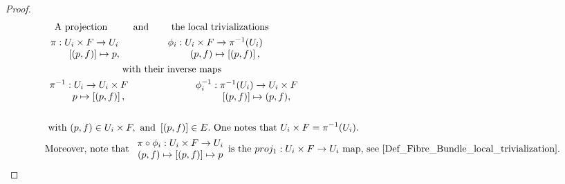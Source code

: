 \begin{proof}
    \begin{equation*}
        \begin{split}
            & \quad \textnormal{A projection } \qquad \textnormal{ and } \qquad  \textnormal{the local trivializations } \\
            &   \begin{array}{c}
                     \pi: U_i \times F \rightarrow U_i \\
                     \qquad \left[(p, f)\right] \mapsto p,
                \end{array} \qquad \qquad
                \begin{array}{cc}
                     \phi_i : U_i \times F \rightarrow \pi^{-1}(U_i)  \\
                     \qquad (p,f) \mapsto \left[(p,f)\right],
                \end{array} %
                \\
            &\qquad \qquad \qquad \qquad
            \textnormal{with their inverse maps } \\
            &   \begin{array}{c}
                     \pi^{-1}: U_i \rightarrow U_i \times F \\
                     \qquad p \mapsto \left[(p, f)\right],
                \end{array} \qquad \qquad \qquad 
                \begin{array}{cc}
                     \phi_i^{-1} : \pi^{-1}(U_i) \rightarrow U_i \times F \\
                     \qquad \left[(p,f)\right] \mapsto (p,f),
                \end{array} \\
            \\
            & \textnormal{ with } (p,f) \in U_i \times F, \textnormal{ and } \left[(p,f)\right] \in E. \textnormal{ One notes that } U_i \times F = \pi^{-1}(U_i). \\
            &\textnormal{Moreover, note that } \begin{array}{cc}
                 \pi \circ \phi_i: U_i \times F \rightarrow U_i
                 \\
                 (p,f) \mapsto \left[(p,f)\right] \mapsto p
            \end{array} \textnormal{is the $proj_1: U_i \times F \rightarrow U_i$ map, see \cref{Def_Fibre_Bundle_local_trivialization}.} 
        \end{split} 
    \end{equation*}


\end{proof}
